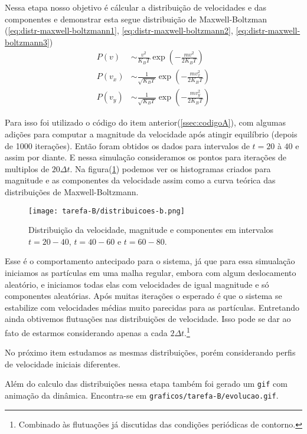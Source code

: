 Nessa etapa nosso objetivo é cálcular a distribuição de velocidades e 
das componentes e demonstrar esta segue distribuição de Maxwell-Boltzman (\ref{eq:distr-maxwell-boltzmann1}, \ref{eq:distr-maxwell-boltzmann2}, \ref{eq:distr-maxwell-boltzmann3})
\begin{align}
    P(v) &\sim \frac{v^2}{K_B T} \exp \left( - \frac{m v^2}{2K_B T} \right) \label{eq:distr-maxwell-boltzmann1}  \\ 
    P(v_x) &\sim \frac{1}{\sqrt{K_B T}}\exp \left( - \frac{m v_x^2}{2K_B T}  \label{eq:distr-maxwell-boltzmann2}\right)\\
    P(v_y) &\sim \frac{1}{\sqrt{K_B T}}\exp \left( - \frac{m v_y^2}{2K_B T}  \label{eq:distr-maxwell-boltzmann3}\right)
\end{align}

Para isso foi utilizado o código do item anterior(\ref{ssec:codigoA}),  com algumas adições para computar a magnitude da velocidade após atingir equilíbrio (depois de 1000 iterações). 
Então foram obtidos os dados para intervalos de $t=20$ à $40$ e assim por diante. E nessa simulação 
consideramos os pontos para iterações de multiplos de $20 \Delta t$. 
Na figura(\ref{fig:distribuicoes-velocidade-b})
podemos ver os histogramas criados para magnitude e as componentes da velocidade assim como 
a curva teórica das distribuições de Maxwell-Boltzmann. 

\begin{figure}[h!]
    \centering
    \texttt{[image: tarefa-B/distribuicoes-b.png]}
    \caption{Distribuição da velocidade, magnitude e componentes em intervalos $t=20-40$, $t=40-60$ e $t=60-80$.}
    \label{fig:distribuicoes-velocidade-b}
\end{figure}

Esse é o comportamento antecipado para o sistema, já que para essa simualação iniciamos as partículas em uma 
malha regular, embora com algum deslocamento aleatório, e iniciamos todas elas com velocidades de igual magnitude e só 
componentes aleatórias. Após muitas iterações o esperado é que o sistema se estabilize com velocidades médias muito 
parecidas para as partículas. Entretando ainda obtivemos flutuações nas distribuições de velocidade. Isso pode 
se dar ao fato de estarmos considerando apenas a cada $2 \Delta t$.\footnote{Combinado às flutuações já discutidas das condições periódicas de contorno.}

No próximo item estudamos as mesmas distribuições, porém considerando perfis de velocidade 
iniciais diferentes. 

Além do calculo das distribuições nessa etapa também foi gerado um \verb|gif| com animação da dinâmica. 
Encontra-se em \verb|graficos/tarefa-B/evolucao.gif|. 

\clearpage